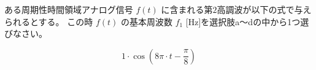 ある周期性時間領域アナログ信号 $f(t)$ に含まれる第$2$高調波が以下の式で与えられるとする。
この時 $f(t)$ の基本周波数 $f_1$ [Hz]を選択肢a〜dの中から1つ選びなさい。

\[
1 \cdot \cos \left ( 8 \pi \cdot t - \frac{\pi}{8} \right )
\]

